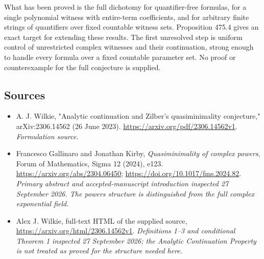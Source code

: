 \documentclass[11pt]{article}
\begin{document}
What has been proved is the full dichotomy for quantifier-free formulas,
for a single polynomial witness with entire-term coefficients, and for
arbitrary finite strings of quantifiers over fixed countable witness
sets. Proposition 475.4 gives an exact target for extending these results.
The first unresolved step is uniform control of unrestricted complex
witnesses and their continuation, strong enough to handle every formula
over a fixed countable parameter set. No proof or counterexample for
the full conjecture is supplied.

\subsection{Sources}
\begin{itemize}
\item[S1]A. J. Wilkie, "Analytic continuation and Zilber's quasiminimality conjecture," arXiv:2306.14562 (26 June 2023).
\url{https://arxiv.org/pdf/2306.14562v1}.
\textit{Formulation source.}
\item[E1]Francesco Gallinaro and Jonathan Kirby, \emph{Quasiminimality
of complex powers}, Forum of Mathematics, Sigma 12 (2024), e123.
\url{https://arxiv.org/abs/2304.06450};
\url{https://doi.org/10.1017/fms.2024.82}.
\textit{Primary abstract and accepted-manuscript introduction inspected
27 September 2026. The powers structure is distinguished from the full
complex exponential field.}
\item[E2]Alex J. Wilkie, full-text HTML of the supplied source,
\url{https://arxiv.org/html/2306.14562v1}.
\textit{Definitions 1--3 and conditional Theorem 1 inspected
27 September 2026; the Analytic Continuation Property is not treated
as proved for the structure needed here.}
\end{itemize}
\end{document}
